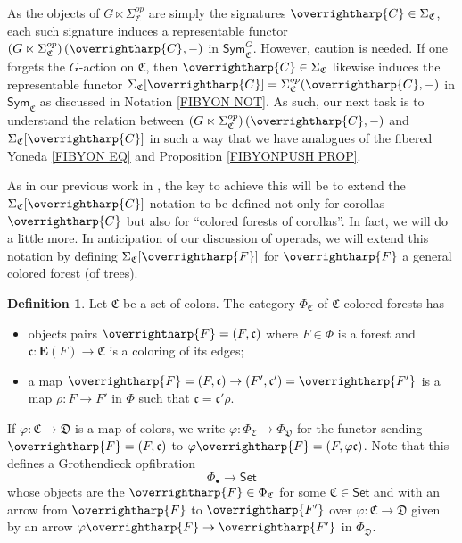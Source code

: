 \documentclass[a4paper,10pt
,draft
]{article}%
\numberwithin{equation}{section}
\numberwithin{figure}{section}
\theoremstyle{definition} %
\newtheorem{definition}[equation]{Definition}%
\newcommand{\vect}[1]{\text{\overrightharp{\ensuremath{#1}}}}
\newcommand{\1}{\ensuremath{\mathbbm 1}}%
\begin{document}
As the objects of 
$G \ltimes \Sigma^{op}_{\mathfrak{C}}$
are simply the signatures
$\vect{C} \in \Sigma_{\mathfrak{C}}$,
each such signature induces a representable functor
$\left(G \ltimes \Sigma^{op}_{\mathfrak{C}}\right)(\vect{C},-)$
in 
$\mathsf{Sym}^G_{\mathfrak{C}}$.
However, caution is needed.
If one forgets the $G$-action on $\mathfrak{C}$,
then $\vect{C} \in \Sigma_{\mathfrak{C}}$
likewise induces the representable functor 
$\Sigma_{\mathfrak{C}}[\vect{C}]=\Sigma^{op}_{\mathfrak{C}}(\vect{C},-)$
in 
$\mathsf{Sym}_{\mathfrak{C}}$
as discussed in Notation \ref{FIBYON NOT}.
%
As such, our next task is to understand the relation between 
$\left(G \ltimes \Sigma^{op}_{\mathfrak{C}}\right)(\vect{C},-)$
and 
$\Sigma_{\mathfrak{C}}[\vect{C}]$
in such a way that we have analogues of the 
fibered Yoneda \eqref{FIBYON EQ}
and Proposition \ref{FIBYONPUSH PROP}.


As in our previous work in 
\cite[Not. 5.56]{Per18}, \cite[\S 2.3]{BP_edss}
the key to achieve this will be to extend the
$\Sigma_{\mathfrak{C}}[\vect{C}]$
notation to be defined not only for corollas $\vect{C}$
but also for ``colored forests of corollas''.
In fact, we will do a little more. 
In anticipation of our discussion of operads, 
we will extend this notation by defining 
$\Sigma_{\mathfrak{C}}[\vect{F}]$
for $\vect{F}$ a general colored forest (of trees).


\begin{definition}\label{COLFOR DEF}
Let $\mathfrak{C}$ be a set of colors.
The category $\Phi_{\mathfrak{C}}$ of $\mathfrak{C}$-colored forests has
\begin{itemize}
\item objects pairs
$\vect{F} = (F,\mathfrak{c})$
where 
$F\in \Phi$ is a forest
and 
$\mathfrak{c}\colon \boldsymbol{E}(F) \to \mathfrak{C}$ 
is a coloring of its edges;
\item a map
$\vect{F}=(F,\mathfrak{c}) \to 
(F',\mathfrak{c}') = \vect{F'}$
is a map $\rho \colon F \to F'$ in $\Phi$
such that
$\mathfrak{c} = \mathfrak{c}' \rho$.
\end{itemize}
If $\varphi\colon \mathfrak{C} \to \mathfrak{D}$ is a map of colors,
we write
$\varphi \colon \Phi_{\mathfrak{C}} \to \Phi_{\mathfrak{D}}$
for the functor sending 
$\vect{F} = (F,\mathfrak{c})$
to 
$\varphi\vect{F} = (F,\varphi\mathfrak{c})$.
Note that this defines a Grothendieck opfibration
\begin{equation}\label{PHIBGRO EQ}
\Phi_{\bullet} \to \mathsf{Set}
\end{equation}
whose objects are the $\vect{F} \in \Phi_{\mathfrak{C}}$ for some
$\mathfrak{C} \in \mathsf{Set}$
and with an arrow
from $\vect{F}$ to $\vect{F'}$
over
$\varphi \colon \mathfrak{C} \to \mathfrak{D}$
given by an arrow
$\varphi \vect{F} \to \vect{F'}$ in $\Phi_{\mathfrak{D}}$.
\end{definition}
\end{document}
